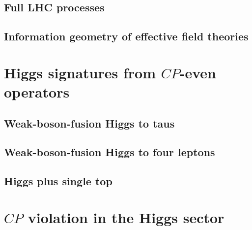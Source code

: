 \subsection{Full LHC processes}

\subsection{Information geometry of effective field theories}



\section{Higgs signatures from $CP$-even operators}
\label{sec:information_application}

\subsection{Weak-boson-fusion Higgs to taus}
\label{sec:information_wbf_taus}

\subsection{Weak-boson-fusion Higgs to four leptons}
\label{sec:information_wbf_4l}

\subsection{Higgs plus single top}
\label{sec:information_th}



\section{$CP$ violation in the Higgs sector}
\label{sec:information_CPV}




